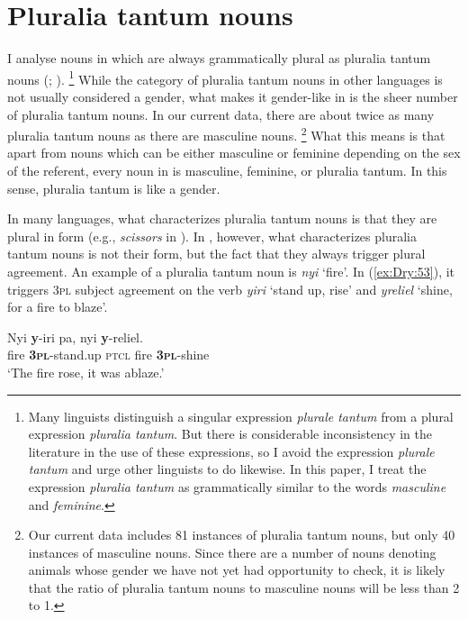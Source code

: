\documentclass[output=collectionpaper]{langsci/langscibook}
\begin{document}
\section{Pluralia tantum nouns}
\label{sec:Dry:4}

I analyse nouns in  which are always grammatically plural as pluralia tantum nouns (\citealt[233ff]{Corbett2012}; \citealt{Acquaviva2008}).%
\footnote{Many linguists distinguish a singular expression \textit{plurale tantum} from a plural expression \textit{pluralia tantum}. But there is considerable inconsistency in the literature in the use of these expressions, so I avoid the expression \textit{plurale tantum} and urge other linguists to do likewise. In this paper, I treat the expression \textit{pluralia tantum} as grammatically similar to the words \textit{masculine} and \textit{feminine}.} %
While the category of pluralia tantum nouns in other languages is not usually considered a gender, what makes it gender-like in  is the sheer number of pluralia tantum nouns. In our current data, there are about twice as many pluralia tantum nouns as there are masculine nouns.%
\footnote{Our current data includes 81 instances of pluralia tantum nouns, but only 40 instances of masculine nouns. Since there are a number of nouns denoting animals whose gender we have not yet had opportunity to check, it is likely that the ratio of pluralia tantum nouns to masculine nouns will be less than 2 to 1.} %
What this means is that apart from nouns which can be either masculine or feminine depending on the sex of the referent, every noun in  is masculine, feminine, or pluralia tantum. In this sense, pluralia tantum is like a gender.

In many languages, what characterizes pluralia tantum nouns is that they are plural in form (e.g., \textit{scissors} in ). In , however, what characterizes pluralia tantum nouns is not their form, but the fact that they always trigger plural agreement. An example of a pluralia tantum noun is \textit{nyi} `fire'. In (\ref{ex:Dry:53}), it triggers \textsc{3pl} subject agreement on the verb \textit{yiri} `stand up, rise' and \textit{yreliel} `shine, for a fire to blaze'.

\ea \label{ex:Dry:53}
\gll Nyi	\textbf{y}-iri	pa,	nyi	\textbf{y}-reliel.\\
fire \textbf{\textsc{3pl}}-stand.up \textsc{ptcl} fire \textbf{\textsc{3pl}}-shine\\
\glt `The fire rose, it was ablaze.'
\z
\end{document}
